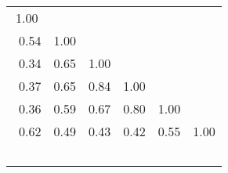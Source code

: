 \begin{table}
\begin{center}
\begin{tabular}{cccccc}
1.00 & & & & & \\\
0.54 & 1.00 & & & & \\\
0.34 & 0.65 & 1.00 & & & \\\
0.37 & 0.65 & 0.84 & 1.00 & & \\\
0.36 & 0.59 & 0.67 & 0.80 & 1.00 & \\\
0.62 & 0.49 & 0.43 & 0.42 & 0.55 & 1.00 \\\
\end{tabular}
\end{center}
\end{table}
